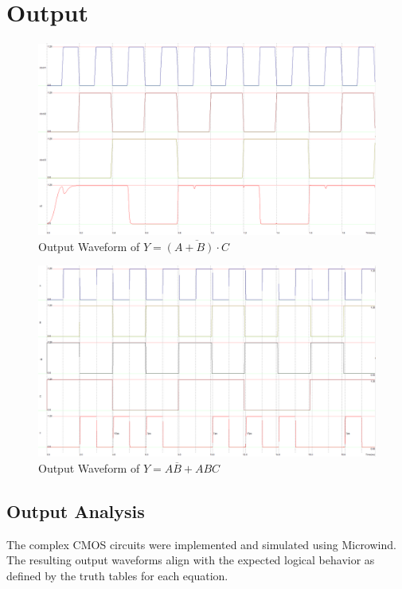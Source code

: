 \documentclass[12pt]{article}
\begin{document}
\section*{Output}

\begin{figure}[H]
  \centering
  \includegraphics[width=.9\textwidth]{output1.png}
  \caption{Output Waveform of \( Y = \overline{(A + B) \cdot C} \)}
\end{figure}

\begin{figure}[H]
  \centering
  \includegraphics[width=.9\textwidth]{output2.png}
  \caption{Output Waveform of \( Y = A\overline{B} + ABC \)}
\end{figure}

\subsection*{Output Analysis}
The complex CMOS circuits were implemented and simulated using Microwind. The resulting output waveforms align with the expected logical behavior as defined by the truth tables for each equation.
\end{document}
